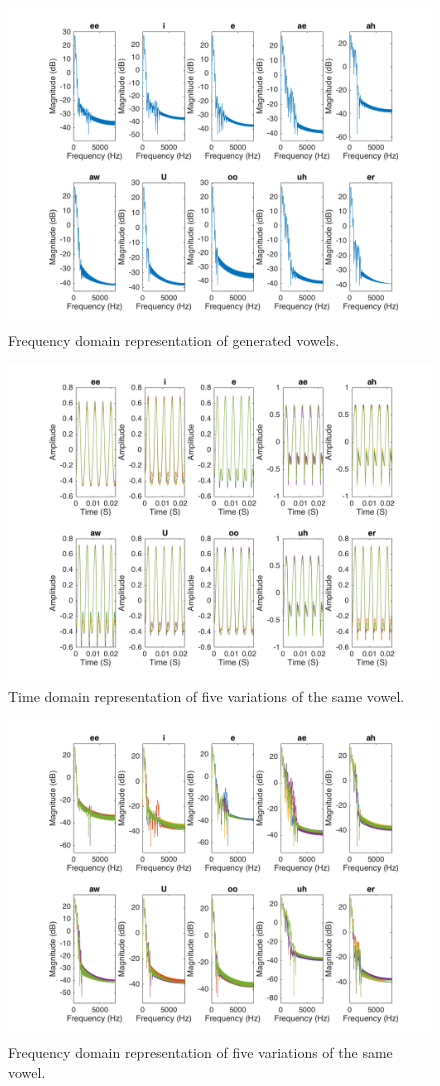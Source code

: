 \documentclass{article}
\begin{document}
\begin{figure}[h]
  \centering
    \includegraphics[width=.6\textwidth]{vowels_freq.png}
  \caption{Frequency domain representation of generated vowels.}
  \label{fig:vowels_freq}
\end{figure}
\begin{figure}[h]
  \centering
    \includegraphics[width=.6\textwidth]{vowel_variation_time.png}
  \caption{Time domain representation of five variations of the same vowel.}
  \label{fig:vowel_variation_time}
\end{figure}
\begin{figure}[h]
  \centering
    \includegraphics[width=.6\textwidth]{vowel_variation_freq.png}
  \caption{Frequency domain representation of five variations of the same vowel.}
  \label{fig:vowel_variation_freq}
\end{figure}
\end{document}
